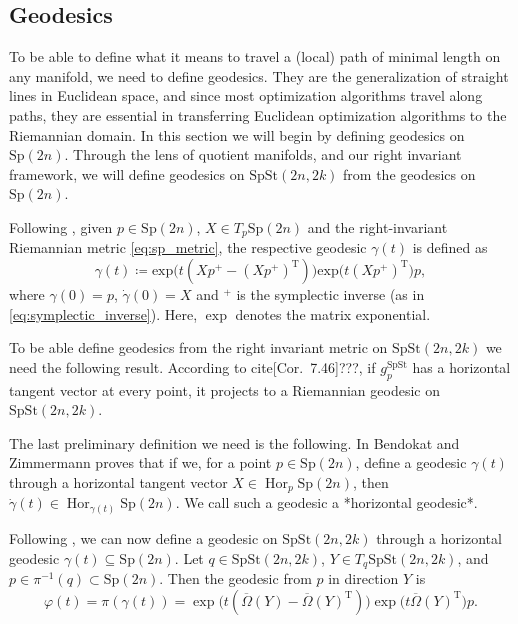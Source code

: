 \subsection{Geodesics}
To be able to define what it means to travel a (local) path of minimal length on any manifold, we need to define geodesics. They are the generalization of straight lines in Euclidean space, and since most optimization algorithms travel along paths, they are essential in transferring Euclidean optimization algorithms to the Riemannian domain. In this section we will begin by defining geodesics on $\mathrm{Sp}(2n)$. Through the lens of quotient manifolds, and our right invariant framework, we will define geodesics on $\mathrm{SpSt}(2n, 2k)$ from the geodesics on $\mathrm{Sp}(2n)$.

Following \cite[Prop.~2.1]{BendokatZimmermann2021}, given $p\in \mathrm{Sp}(2n)$,  $X\in T_{p}\mathrm{Sp}(2n)$ and the right-invariant Riemannian metric \eqref{eq:sp_metric}, the respective geodesic $\gamma(t)$ is defined as
\begin{equation*}
    \gamma(t)\coloneqq \mathrm{exp}\big(t(Xp^{+}-(Xp^{+}) ^{\mathrm{T}})\big)\mathrm{exp}\big(t(Xp^{+})^{\mathrm{T}}\big)p,
\end{equation*}
where $\gamma(0)=p$, $\dot{\gamma}(0)=X$ and $^{+}$ is the symplectic inverse (as in \eqref{eq:symplectic_inverse}). Here, $\operatorname{\exp}$ denotes the matrix exponential. 

To be able define geodesics from the right invariant metric on $\mathrm{SpSt}(2n, 2k)$ we need the following result. According to cite[Cor.~7.46]{???}, if $g_{p}^\mathrm{SpSt}$ has a horizontal tangent vector at every point, it projects to a Riemannian geodesic on $\mathrm{SpSt}(2n, 2k)$. 

The last preliminary definition we need is the following. In \cite[Lemma 3.11]{BZ} Bendokat and Zimmermann proves that if we, for a point $p \in \mathrm{Sp}(2n)$, define a geodesic $\gamma(t)$ through a horizontal tangent vector $X\in \operatorname{Hor}_{p}\mathrm{Sp}(2n)$, then $\dot{\gamma}(t)\in \operatorname{Hor}_{\gamma(t)}\mathrm{Sp}(2n)$. We call such a geodesic a *horizontal geodesic*.

Following \cite[Prop. 3.12]{BZ}, we can now define a geodesic on $\mathrm{SpSt}(2n, 2k)$ through a horizontal geodesic $\gamma(t)\subseteq\mathrm{Sp}(2n)$. Let $q\in \mathrm{SpSt}(2n, 2k)$, $Y\in T_{q}\mathrm{SpSt}(2n, 2k)$, and $p\in \pi^{-1}(q)\subset \mathrm{Sp}(2n)$. Then the geodesic from $p$ in direction $Y$ is
%
\begin{equation}
\varphi(t)=\pi(\gamma(t))=\exp\big(t(\overline{\Omega}(Y)-\overline{\Omega}(Y)^{\mathrm{T}})\big)\exp\big(t \overline{\Omega}(Y)^{\mathrm{T}}\big)p.
\end{equation}
%